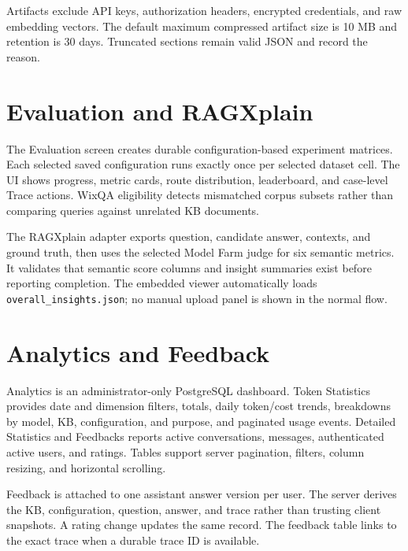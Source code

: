 Artifacts exclude API keys, authorization headers, encrypted credentials, and
raw embedding vectors. The default maximum compressed artifact size is 10 MB
and retention is 30 days. Truncated sections remain valid JSON and record the
reason.


\section{Evaluation and RAGXplain}

The Evaluation screen creates durable configuration-based experiment matrices.
Each selected saved configuration runs exactly once per selected dataset cell.
The UI shows progress, metric cards, route distribution, leaderboard, and
case-level Trace actions. WixQA eligibility detects mismatched corpus subsets
rather than comparing queries against unrelated KB documents.

The RAGXplain adapter exports question, candidate answer, contexts, and ground
truth, then uses the selected Model Farm judge for six semantic metrics. It
validates that semantic score columns and insight summaries exist before
reporting completion. The embedded viewer automatically loads
\texttt{overall\_insights.json}; no manual upload panel is shown in the normal
flow.


\section{Analytics and Feedback}

Analytics is an administrator-only PostgreSQL dashboard. Token Statistics
provides date and dimension filters, totals, daily token/cost trends,
breakdowns by model, KB, configuration, and purpose, and paginated usage
events. Detailed Statistics and Feedbacks reports active conversations,
messages, authenticated active users, and ratings. Tables support server
pagination, filters, column resizing, and horizontal scrolling.

Feedback is attached to one assistant answer version per user. The server
derives the KB, configuration, question, answer, and trace rather than trusting
client snapshots. A rating change updates the same record. The feedback table
links to the exact trace when a durable trace ID is available.


